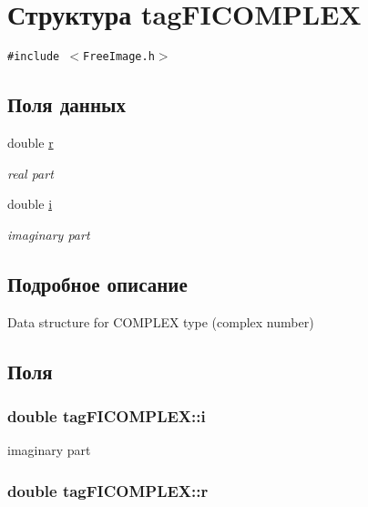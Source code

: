 \hypertarget{structtag_f_i_c_o_m_p_l_e_x}{
\section{Структура tagFICOMPLEX}
\label{structtag_f_i_c_o_m_p_l_e_x}
}
{\tt \#include $<$FreeImage.h$>$}

\subsection*{Поля данных}
\begin{CompactItemize}
\item 
double \hyperlink{structtag_f_i_c_o_m_p_l_e_x_448818f3de56c81064bdcb1ba78a7ead}{r}
\begin{CompactList}\small\item\em real part \item\end{CompactList}\item 
double \hyperlink{structtag_f_i_c_o_m_p_l_e_x_d2cc2cc6d32c1e5496f2c77e185d8218}{i}
\begin{CompactList}\small\item\em imaginary part \item\end{CompactList}\end{CompactItemize}


\subsection{Подробное описание}
Data structure for COMPLEX type (complex number) 

\subsection{Поля}
\hypertarget{structtag_f_i_c_o_m_p_l_e_x_d2cc2cc6d32c1e5496f2c77e185d8218}{
\subsubsection[{i}]{\setlength{\rightskip}{0pt plus 5cm}double {\bf tagFICOMPLEX::i}}}
\label{structtag_f_i_c_o_m_p_l_e_x_d2cc2cc6d32c1e5496f2c77e185d8218}


imaginary part 

\hypertarget{structtag_f_i_c_o_m_p_l_e_x_448818f3de56c81064bdcb1ba78a7ead}{
\subsubsection[{r}]{\setlength{\rightskip}{0pt plus 5cm}double {\bf tagFICOMPLEX::r}}}
\label{structtag_f_i_c_o_m_p_l_e_x_448818f3de56c81064bdcb1ba78a7ead}


